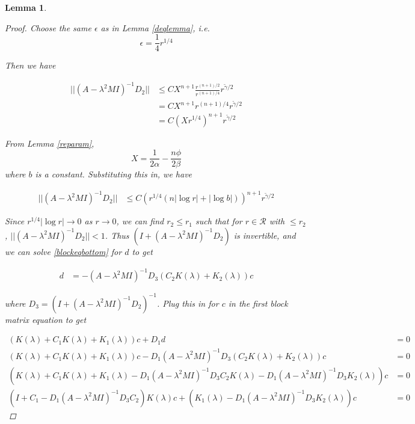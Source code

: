 \documentclass[12pt]{article}
\newtheorem{lemma}{Lemma}
\begin{document}
\begin{lemma}
\begin{proof}
Choose the same $\epsilon$ as in Lemma \ref{deqlemma}, i.e. 
\begin{equation*}
\epsilon = \frac{1}{4}r^{1/4}
\end{equation*}

Then we have

\begin{align*}
|| (A - \lambda^2 MI)^{-1} D_2 ||
&\leq C X^{n+1} \frac{ r^{(n+1)/2}}{ r^{(n+1)/4} } r^{\tilde{\gamma}/2} \\
&= C X^{n+1} r^{(n+1)/4} r^{\tilde{\gamma}/2} \\
&= C ( X r^{1/4} )^{n+1} r^{\tilde{\gamma}/2}
\end{align*}

From Lemma \ref{reparam}, 
\begin{equation*}
X = \frac{1}{2\alpha}  - \frac{n \phi}{2 \beta}
\end{equation*}
where $b$ is a constant. Substituting this in, we have

\begin{align*}
|| (A - \lambda^2 MI)^{-1} D_2 ||
&\leq C \left( r^{1/4} (n |\log r| + |\log b| )\right)^{n+1} r^{\tilde{\gamma}/2}
\end{align*}

Since $r^{1/4} |\log r| \rightarrow 0$ as $r \rightarrow 0$, we can find $r_2 \leq r_1$ such that for $r \in \mathcal{R}$ with $\leq r_2$, $|| (A - \lambda^2 MI)^{-1} D_2 || < 1$. Thus $(I + (A - \lambda^2 MI)^{-1} D_2)$ is invertible, and we can solve \eqref{blockeqbottom} for $d$ to get

\begin{align*}
d &= -(A - \lambda^2 MI)^{-1} D_3 (C_2 K(\lambda) + K_2(\lambda))c
\end{align*}

where $D_3 = (I + (A - \lambda^2 MI)^{-1} D_2)^{-1}$. Plug this in for $c$ in the first block matrix equation to get

\begin{align*}
(K(\lambda) + C_1 K(\lambda) + K_1(\lambda))c + D_1 d &= 0 \\
(K(\lambda) + C_1 K(\lambda) + K_1(\lambda))c - D_1 (A - \lambda^2 MI)^{-1} D_3 (C_2 K(\lambda) + K_2(\lambda))c &= 0 \\
(K(\lambda) + C_1 K(\lambda) + K_1(\lambda) - D_1 (A - \lambda^2 MI)^{-1} D_3 C_2 K(\lambda) - D_1 (A - \lambda^2 MI)^{-1} D_3 K_2(\lambda))c &= 0 \\
(I + C_1 - D_1 (A - \lambda^2 MI)^{-1} D_3 C_2) K(\lambda)c + (K_1(\lambda) - D_1 (A - \lambda^2 MI)^{-1} D_3 K_2(\lambda))c &= 0
\end{align*}


\end{proof}
\end{lemma}
\end{document}
